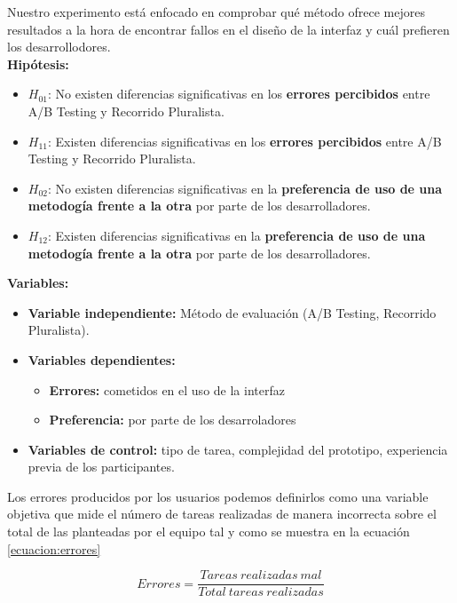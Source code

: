 \documentclass[a4paper,12pt]{report}
\begin{document}
Nuestro experimento está enfocado en comprobar qué método ofrece mejores resultados a la hora de encontrar fallos en el diseño de la interfaz y cuál prefieren los desarrollodores. \\
\vspace{0.1cm}
\textbf{Hipótesis:}
\begin{itemize}
    \item $H_{01}$: No existen diferencias significativas en los \textbf{errores percibidos} entre A/B Testing y Recorrido Pluralista.  
    \item $H_{11}$: Existen diferencias significativas en los \textbf{errores percibidos} entre A/B Testing y Recorrido Pluralista.
        \item $H_{02}$: No existen diferencias significativas en la \textbf{preferencia de uso de una metodogía frente a la otra} por parte de los desarrolladores.  
    \item $H_{12}$: Existen diferencias significativas en la \textbf{preferencia de uso de una metodogía frente a la otra} por parte de los desarrolladores.
\end{itemize}

\textbf{Variables:}
\begin{itemize}
    \item \textbf{Variable independiente:} Método de evaluación (A/B Testing, Recorrido Pluralista).
    \item \textbf{Variables dependientes:}
    \begin{itemize}
        \item \textbf{Errores:} cometidos en el uso de la interfaz
        \item \textbf{Preferencia:} por parte de los desarroladores
    \end{itemize}
    \item \textbf{Variables de control:} tipo de tarea, complejidad del prototipo, experiencia previa de los participantes.
\end{itemize}

Los errores producidos por los usuarios podemos definirlos como una variable objetiva que mide el número de tareas realizadas de manera incorrecta sobre el total de las planteadas por el equipo tal y como se muestra en la ecuación \ref{ecuacion:errores}

\begin{equation}
Errores = \frac{Tareas\ realizadas\ mal}{Total\ tareas\ realizadas}
\label{ecuacion:errores}
\end{equation}
\end{document}

